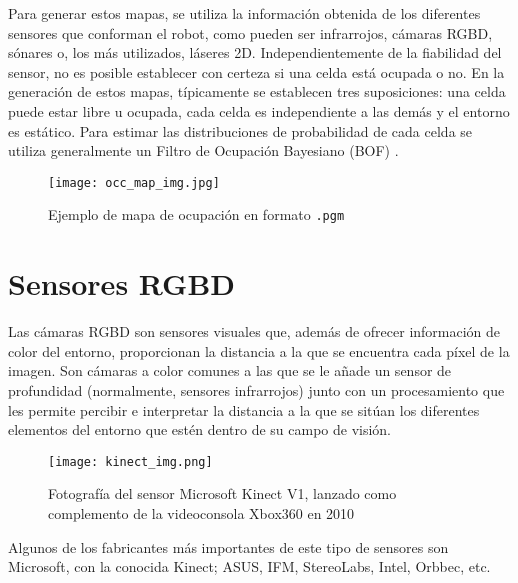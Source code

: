 Para generar estos mapas, se utiliza la información obtenida de los diferentes sensores que conforman el robot, como pueden ser infrarrojos, cámaras RGBD, sónares o, los más utilizados, láseres 2D. Independientemente de la fiabilidad del sensor, no es posible establecer con certeza si una celda está ocupada o no. En la generación de estos mapas, típicamente se establecen tres suposiciones: una celda puede estar libre u ocupada, cada celda es independiente a las demás y el entorno es estático. Para estimar las distribuciones de probabilidad de cada celda se utiliza generalmente un Filtro de Ocupación Bayesiano (BOF) \cite{occupancy_grid}.\\

\begin{figure}[h]
\begin{center} \label{fig:occ_map}
\texttt{[image: occ\_map\_img.jpg]}
\end{center}
\caption{Ejemplo de mapa de ocupación en formato \texttt{.pgm}}
\end{figure}

\section{Sensores RGBD}

Las cámaras RGBD son sensores visuales que, además de ofrecer información de color del entorno, proporcionan la distancia a la que se encuentra cada píxel de la imagen. Son cámaras a color comunes a las que se le añade un sensor de profundidad (normalmente, sensores infrarrojos) junto con un procesamiento que les permite percibir e interpretar la distancia a la que se sitúan los diferentes elementos del entorno que estén dentro de su campo de visión.\\

\begin{figure}[h]
	\begin{center} 
		\texttt{[image: kinect\_img.png]}
	\end{center}
	\caption{Fotografía del sensor Microsoft Kinect V1, lanzado como complemento de la videoconsola Xbox360 en 2010 \cite{kinectv1}}
	\label{fig:kinect}
\end{figure}

Algunos de los fabricantes más importantes de este tipo de sensores son Microsoft, con la conocida Kinect; ASUS, IFM, StereoLabs, Intel, Orbbec, etc.\\

